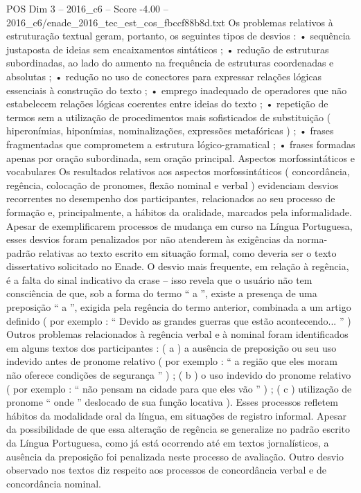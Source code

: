 \begin{textsample}{POS Dim 3 – 2016\_c6 – Score -4.00 – 2016\_c6/enade\_2016\_tec\_est\_cos\_fbccf88b8d.txt}
Os problemas relativos à estruturação textual geram, portanto, os seguintes tipos de desvios : • sequência justaposta de ideias sem encaixamentos sintáticos ; • redução de estruturas subordinadas, ao lado do aumento na frequência de estruturas coordenadas e absolutas ; • redução no uso de conectores para expressar relações lógicas essenciais à construção do texto ; • emprego inadequado de operadores que não estabelecem relações lógicas coerentes entre ideias do texto ; • repetição de termos sem a utilização de procedimentos mais sofisticados de substituição ( hiperonímias, hiponímias, nominalizações, expressões metafóricas ) ; • frases fragmentadas que comprometem a estrutura lógico-gramatical ; • frases formadas apenas por oração subordinada, sem oração principal.
Aspectos morfossintáticos e vocabulares Os resultados relativos aos aspectos morfossintáticos ( concordância, regência, colocação de pronomes, flexão nominal e verbal ) evidenciam desvios recorrentes no desempenho dos participantes, relacionados ao seu processo de formação e, principalmente, a hábitos da oralidade, marcados pela informalidade.
Apesar de exemplificarem processos de mudança em curso na Língua Portuguesa, esses desvios foram penalizados por não atenderem às exigências da norma-padrão relativas ao texto escrito em situação formal, como deveria ser o texto dissertativo solicitado no Enade.
O desvio mais frequente, em relação à regência, é a falta do sinal indicativo da crase – isso revela que o usuário não tem consciência de que, sob a forma do termo “ a ”, existe a presença de uma preposição “ a ”, exigida pela regência do termo anterior, combinada a um artigo definido ( por exemplo : “ Devido as grandes guerras que estão acontecendo... ” ) Outros problemas relacionados à regência verbal e à nominal foram identificados em alguns textos dos participantes : ( a ) a ausência de preposição ou seu uso indevido antes de pronome relativo ( por exemplo : “ a região que eles moram não oferece condições de segurança ” ) ; ( b ) o uso indevido do pronome relativo ( por exemplo : “ não pensam na cidade para que eles vão ” ) ; ( c ) utilização de pronome “ onde ” deslocado de sua função locativa ).
Esses processos refletem hábitos da modalidade oral da língua, em situações de registro informal.
Apesar da possibilidade de que essa alteração de regência se generalize no padrão escrito da Língua Portuguesa, como já está ocorrendo até em textos jornalísticos, a ausência da preposição foi penalizada neste processo de avaliação.
Outro desvio observado nos textos diz respeito aos processos de concordância verbal e de concordância nominal.

\end{textsample}
